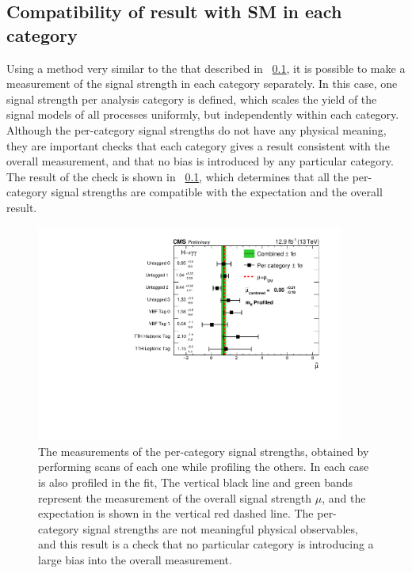 \subsection{Compatibility of result with SM in each category}

Using a method very similar to the that described in \Sec~\ref{}, it is possible to make a measurement of the signal strength in each category separately. In this case, one signal strength per analysis category is defined, which scales the yield of the signal models of all processes uniformly, but independently within each category. Although the per-category signal strengths do not have any physical meaning, they are important checks that each category gives a result consistent with the overall measurement, and that no bias is introduced by any particular category. The result of the check is shown in \Fig~\ref{}, which determines that all the per-category signal strengths are compatible with the \SM expectation and the overall result.

\begin{figure}[ht!]
\centering
\includegraphics[width=0.9\textwidth]{statandresultsFigures/PerTagChannelCompatibilityProfileMH.pdf} 
\caption{The measurements of the per-category signal strengths, obtained by performing \DNLL scans of each one while profiling the others. In each case \mH is also profiled in the fit, The vertical black line and green bands represent the measurement of the overall signal strength $\mu$, and the \SM expectation is shown in the vertical red dashed line. The per-category signal strengths are not meaningful physical observables, and this result is a check that no particular category is introducing a large bias into the overall measurement.}

\label{fig:statandresults:mu_per_tag}

\end{figure}

